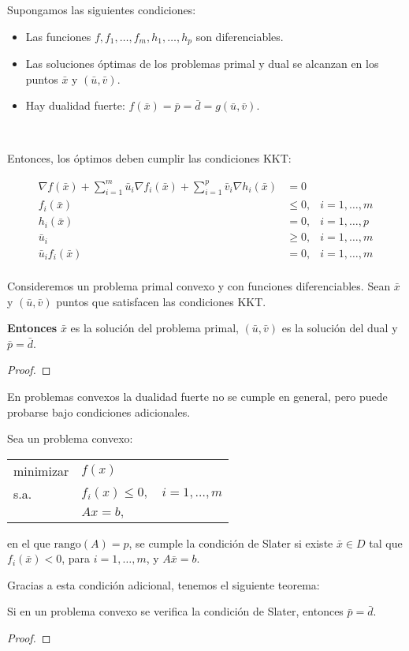 Supongamos las siguientes condiciones:

\begin{itemize}
\item Las funciones $f,f_1,\ldots, f_m,h_1,\ldots,h_p$ son diferenciables.
\item Las soluciones óptimas de los problemas primal y dual se alcanzan en los puntos
 $\bar{x}$ y $(\bar{u},\bar{v})$.
\item Hay dualidad fuerte: $f(\bar{x})=\bar{p}=\bar{d}=g(\bar{u},\bar{v})$.
\end{itemize}


\

Entonces, los óptimos deben cumplir las condiciones KKT:

\begin{align*}
\nabla f(\bar{x}) + \sum_{i=1}^m \bar{u}_i \nabla f_i(\bar{x}) + \sum_{i=1}^p \bar{v}_i\nabla h_i(\bar{x}) & = 0 \\
f_i(\bar{x}) &\leq 0, & i = 1,\ldots,m \\
h_i(\bar{x}) &= 0, & i = 1,\ldots,p \\
\bar{u}_i    & \geq 0, & i = 1,\ldots,m\\
\bar{u}_i f_i(\bar{x}) &  = 0, & i = 1,\ldots,m\\
\end{align*}



\begin{theorem}
\label{thm:convKKT}

Consideremos un problema primal convexo y con funciones diferenciables.
%
Sean $\bar{x}$ y $(\bar{u},\bar{v})$ puntos que satisfacen las condiciones KKT. 

\textbf{Entonces} $\bar{x}$ es la solución del problema primal, $(\bar{u},\bar{v})$ es la solución del dual y  $\bar{p} =  \bar{d}$.
\end{theorem}

\begin{proof}
\end{proof}

En problemas convexos la dualidad fuerte no se cumple en general, pero puede probarse bajo condiciones adicionales.

\begin{defn}

Sea un problema convexo:

\begin{tabular}{lll}
minimizar & $f(x)$ & \\
s.a. & $f_i(x)\leq 0,$  &  $i=1,\ldots,m$ \\
	 & $Ax=b,$  &  
\end{tabular}

en el que $\mbox{rango}(A)=p$, se cumple la condición de Slater si existe $\bar{x}\in D$  tal que $f_i(\bar{x})<0$, para $i=1,\ldots,m$, y $A\bar{x}=b$. 
\end{defn}

Gracias a esta condición adicional, tenemos el siguiente teorema:

\begin{theorem}
Si en un problema convexo se verifica la condición de Slater, entonces $\bar{p} =  \bar{d}$.
\end{theorem}

\begin{proof}
\end{proof}


